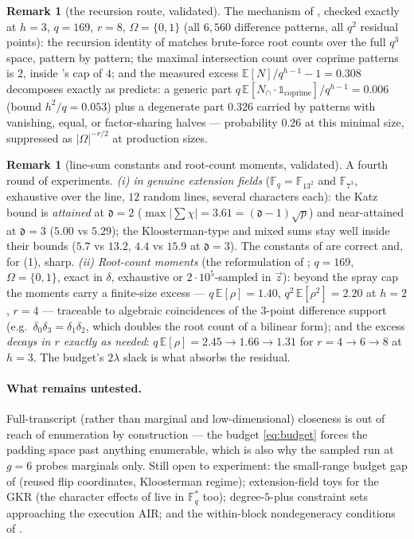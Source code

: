 \documentclass{article}
\newcommand{\Fq}{\mathbb{F}_q}
\newcommand{\extdeg}{\mathfrak{d}}
\theoremstyle{definition}
\newtheorem{remark}[theorem]{Remark}
\begin{document}
\begin{remark}[the recursion route, validated]\label{rem:numG}
The mechanism of , checked exactly at $h = 3$, $q = 169$, $r = 8$, $\Omega = \{0,1\}$ (all $6{,}560$ difference patterns, all $q^2$ residual points):
the recursion identity of  matches brute-force root counts over the full $q^3$ space, pattern by pattern;
the maximal intersection count over coprime patterns is $2$, inside 's cap of $4$;
and the measured excess $\mathbb{E}[N]/q^{h-1} - 1 = 0.308$ decomposes exactly as  predicts: a generic part $q\,\mathbb{E}[N_\cap \cdot \mathbb{1}_{\mathrm{coprime}}]/q^{h-1} = 0.006$ (bound $h^2/q = 0.053$) plus a degenerate part $0.326$ carried by patterns with vanishing, equal, or factor-sharing halves --- probability $0.26$ at this minimal size, suppressed as $|\Omega|^{-r/2}$ at production sizes.
\end{remark}

\begin{remark}[line-sum constants and root-count moments, validated]\label{rem:numF}
A fourth round of experiments.
\emph{(i)  in genuine extension fields} ($\Fq = \mathbb{F}_{13^2}$ and $\mathbb{F}_{7^3}$, exhaustive over the line, $12$ random lines, several characters each): the Katz bound is \emph{attained} at $\extdeg = 2$ ($\max |{\textstyle\sum}\chi| = 3.61 = (\extdeg-1)\sqrt p$) and near-attained at $\extdeg = 3$ ($5.00$ vs $5.29$); the Kloosterman-type and mixed sums stay well inside their bounds ($5.7$ vs $13.2$, $4.4$ vs $15.9$ at $\extdeg = 3$). The constants of  are correct and, for (1), sharp.
\emph{(ii) Root-count moments} (the reformulation of ; $q = 169$, $\Omega = \{0,1\}$, exact in $\delta$, exhaustive or $2 \cdot 10^5$-sampled in $\vec z$): beyond the spray cap the moments carry a finite-size excess --- $q\,\mathbb{E}[\rho] = 1.40$, $q^2\,\mathbb{E}[\rho^2] = 2.20$ at $h = 2$, $r = 4$ --- traceable to algebraic coincidences of the $3$-point difference support (e.g.\ $\delta_0\delta_3 = \delta_1\delta_2$, which doubles the root count of a bilinear form); and the excess \emph{decays in $r$ exactly as needed}: $q\,\mathbb{E}[\rho] = 2.45 \to 1.66 \to 1.31$ for $r = 4 \to 6 \to 8$ at $h = 3$. The budget's $2\lambda$ slack is what absorbs the residual.
\end{remark}

\paragraph{What remains untested.} Full-transcript (rather than marginal and low-dimensional) closeness is out of reach of enumeration by construction --- the budget \cref{eq:budget} forces the padding space past anything enumerable, which is also why the sampled run at $g = 6$ probes marginals only. Still open to experiment: the small-range budget gap of  (reused flip coordinates, Kloosterman regime); extension-field toys for the GKR (the character effects of  live in $\Fq^*$ too); degree-$5$-plus constraint sets approaching the execution AIR; and the within-block nondegeneracy conditions of .
\end{document}
